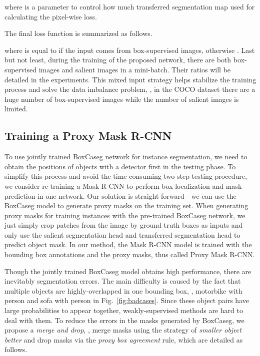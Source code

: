 \documentclass[final]{cvpr}
\begin{document}
where  is a parameter to control how much transferred segmentation map used for calculating the pixel-wise loss.



The final loss function is summarized as follows.

where  is equal to  if the input comes from box-supervised images, otherwise . Last but not least, during the training of the proposed network, there are both box-supervised images and salient images in a mini-batch. Their ratios will be detailed in the experiments. This mixed input strategy helps stabilize the training process and solve the data imbalance problem, \eg, in the COCO dataset there are a huge number of box-supervised images while the number of salient images is limited. 









\subsection{Training a Proxy Mask R-CNN}\label{sec:retraining}

To use jointly trained BoxCaseg network for instance segmentation, we need to obtain the positions of objects with a detector first in the testing phase. To simplify this process and avoid the time-consuming two-step testing procedure, we consider re-training a Mask R-CNN to perform box localization and mask prediction in one network. Our solution is straight-forward - we can use the BoxCaseg model to generate proxy masks on the training set. When generating proxy masks for training instances with the pre-trained BoxCaseg network, we just simply crop patches from the image by ground truth boxes as inputs and only use the salient segmentation head and transferred segmentation head to predict object mask. In our method, the Mask R-CNN model is trained with the bounding box annotations and the proxy masks, thus called Proxy Mask R-CNN. 

Though the jointly trained BoxCaseg model obtains high performance, there are inevitably segmentation errors. The main difficulty is caused by the fact that multiple objects are highly-overlapped in one bounding box, \eg, motorbike with person and sofa with person in Fig.~\ref{fig:badcases}. Since these object pairs have large probabilities to appear together, weakly-supervised methods are hard to deal with them. To reduce the errors in the masks generated by BoxCaseg, we propose a \textit{merge and drop}, \ie, merge masks using the strategy of \textit{smaller object better} and drop masks via the \textit{proxy box agreement} rule, which are detailed as follows.
\end{document}
